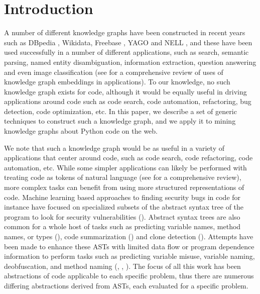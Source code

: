 \section{Introduction}
A number of different knowledge graphs have been constructed in recent years such as DBpedia \cite{dbpedia-swj}, Wikidata, Freebase \cite{Bollacker08freebase:a}, YAGO \cite{Suchanek:2007:YCS:1242572.1242667} and NELL \cite{Carlson:2010:TAN:2898607.2898816}, and these have been used successfully in a number of different applications, such as search, semantic parsing, named entity disambiguation, information extraction, question answering and even image classification (see \cite{journals/tkde/WangMWG17} for a comprehensive review of uses of knowledge graph embeddings in applications).  To our knowledge, no such knowledge graph exists for code, although it would be equally useful in driving applications around code such as code search, code automation, refactoring, bug detection, code optimization, etc.  In this paper, we describe a set of generic techniques to construct such a knowledge graph, and we apply it to mining knowledge graphs about Python code on the web.

We note that such a knowledge graph would be as useful in a variety of applications that center around code, such as code search, code refactoring, code automation, etc.  While some simpler applications can likely be performed with treating code as tokens of natural language (see \cite{Allamanis:2018:SML:3236632.3212695} for a comprehensive review), more complex tasks can benefit from using more structured representations of code.  Machine learning based approaches to finding security bugs in code for instance have focused on specialized subsets of the abstract syntax tree of the program to look for security vulnerabilities (\cite{DBLP:journals/corr/abs-1807-06756}).  Abstract syntax trees are also common for a whole host of tasks such as predicting variable names, method names, or types (\cite{DBLP:journals/corr/abs-1803-09544}), code summarization (\cite{DBLP:journals/corr/abs-1708-01837}) and clone detection (\cite{White:2016:DLC:2970276.2970326}).  Attempts have been made to enhance these ASTs with limited data flow or program dependence information to perform tasks such as predicting variable misuse, variable naming, deobfuscation, and method naming (\cite{DBLP:journals/corr/abs-1711-00740}, \cite{Bichsel:2016:SDA:2976749.2978422}, \cite{DBLP:journals/corr/abs-1808-01400}).   The focus of all this work has been abstractions of code applicable to each specific problem, thus there are numerous differing abstractions derived from ASTs, each evaluated for a specific problem.  

